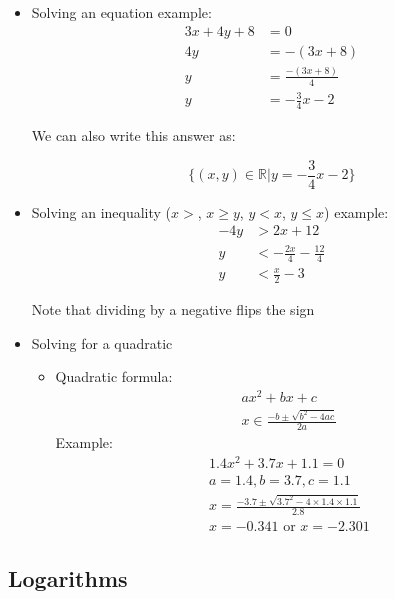 \begin{itemize}
    \item Solving an equation example:
    \begin{align*}
        3x + 4y + 8 & = 0 \\
        4y & = - (3x + 8) \\
        y & = \frac{- (3x + 8)}{4} \\
        y & = -\frac{3}{4}x - 2
    \end{align*}
    
    \noindent We can also write this answer as:
    
    \begin{equation*}
        \{(x,y) \in \mathbb{R} | y = - \frac{3}{4} x - 2 \}
    \end{equation*}
    
    \item Solving an inequality ($x > $, $x \geq y$, $y < x$, $y \leq x$) example:
    \begin{align*}
        -4y & > 2x + 12 \\
        y & < -\frac{2x}{4} - \frac{12}{4} \\
        y & < \frac{x}{2} - 3
    \end{align*}

    \noindent Note that dividing by a negative flips the sign

    \item Solving for a quadratic
    \begin{itemize}
        \item Quadratic formula:
        \begin{align*}
            & ax^2 + bx + c \\
            & x \in \frac{-b \pm \sqrt{b^2 - 4ac}}{2a}
        \end{align*}
        \noindent Example:
        \begin{align*}
            & 1.4x^2 + 3.7x + 1.1 = 0 \\
            & a = 1.4, b = 3.7, c = 1.1 \\
            & x = \frac{-3.7 \pm \sqrt{3.7^2 -
                4 \times 1.4 \times 1.1}}{2.8} \\
            & x = - 0.341 \text{ or } x = -2.301 
        \end{align*}
    \end{itemize}
\end{itemize}

\subsection{Logarithms}


